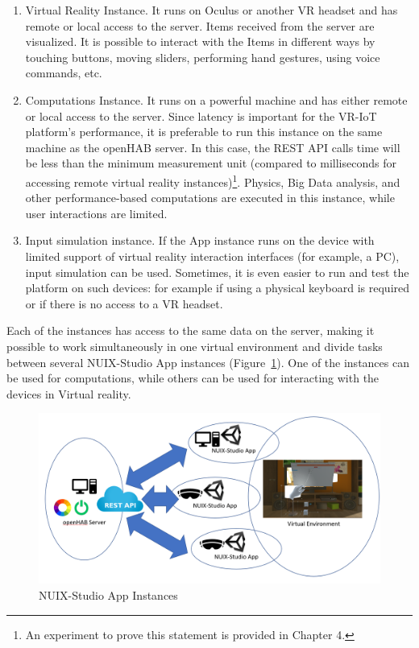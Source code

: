 \begin{enumerate}
    \item Virtual Reality Instance. It runs on Oculus or another VR headset and has remote or local access to the server. Items received from the server are visualized. It is possible to interact with the Items in different ways by touching buttons, moving sliders, performing hand gestures, using voice commands, etc. 
    \item Computations Instance. It runs on a powerful machine and has either remote or local access to the server. Since latency is important for the VR-IoT platform's performance, it is preferable to run this instance on the same machine as the openHAB server. In this case, the REST API calls time will be less than the minimum measurement unit (compared to milliseconds for accessing remote virtual reality instances)\footnote{An experiment to prove this statement is provided in Chapter 4.}. Physics, Big Data analysis, and other performance-based computations are executed in this instance, while user interactions are limited.
    \item Input simulation instance. If the App instance runs on the device with limited support of virtual reality interaction interfaces (for example, a PC), input simulation can be used. Sometimes, it is even easier to run and test the platform on such devices: for example if using a physical keyboard is required or if there is no access to a VR headset.
\end{enumerate}

Each of the instances has access to the same data on the server, making it possible to work simultaneously in one virtual environment and divide tasks between several NUIX-Studio App instances (Figure~\ref{fig:AppInstances-figure}). One of the instances can be used for computations, while others can be used for interacting with the devices in Virtual reality.

\begin{figure}
  \centering
  \includegraphics[width=0.9\linewidth]{figures/AppInstances.png}
  \caption{NUIX-Studio App Instances}
  \label{fig:AppInstances-figure}
\end{figure}

